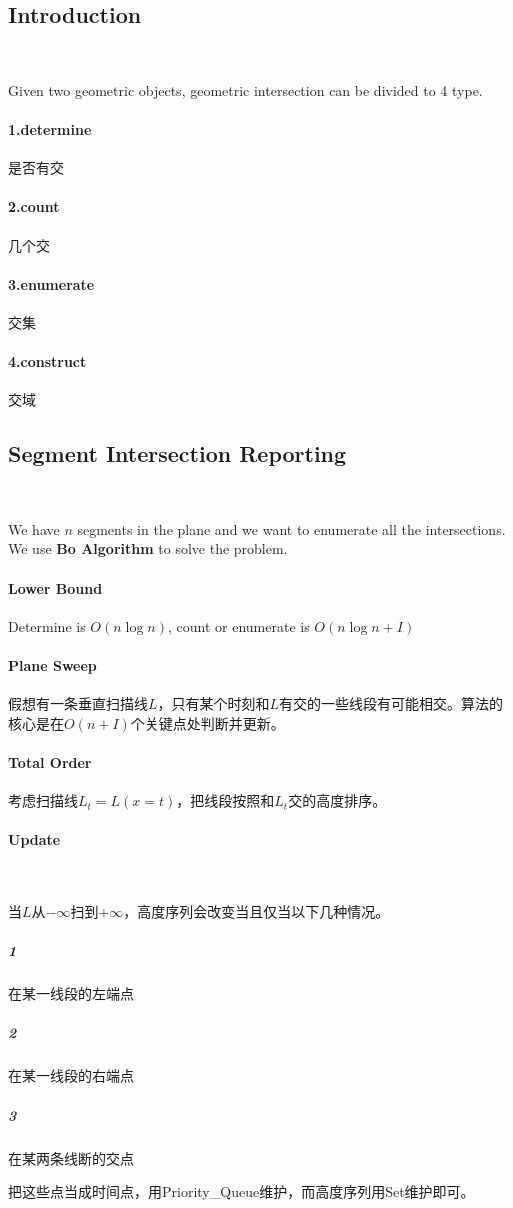 \documentclass[12pt]{article}
\begin{document}
\begin{CJK*}{GBK}{song}
        \subsection{Introduction}\
            \par Given two geometric objects, geometric intersection can be divided to 4 type.
            \paragraph{1.determine}是否有交
            \paragraph{2.count}几个交
            \paragraph{3.enumerate}交集
            \paragraph{4.construct}交域
        \subsection{Segment Intersection Reporting}\
            \par We have $n$ segments in the plane and we want to enumerate all the intersections. We use \textbf{Bo Algorithm} to solve the problem.
            \paragraph{Lower Bound}Determine is $O(n\log n)$, count or enumerate is $O(n\log n+I)$
            \paragraph{Plane Sweep}假想有一条垂直扫描线$L$，只有某个时刻和$L$有交的一些线段有可能相交。算法的核心是在$O(n+I)$个关键点处判断并更新。
            \paragraph{Total Order}考虑扫描线$L_t=L(x=t)$，把线段按照和$L_t$交的高度排序。
            \paragraph{Update}\
                \par 当$L$从$-\infty$扫到$+\infty$，高度序列会改变当且仅当以下几种情况。
                \subparagraph{1}在某一线段的左端点
                \subparagraph{2}在某一线段的右端点
                \subparagraph{3}在某两条线断的交点
                \par 把这些点当成时间点，用Priority\_Queue维护，而高度序列用Set维护即可。

\end{CJK*}
\end{document}
